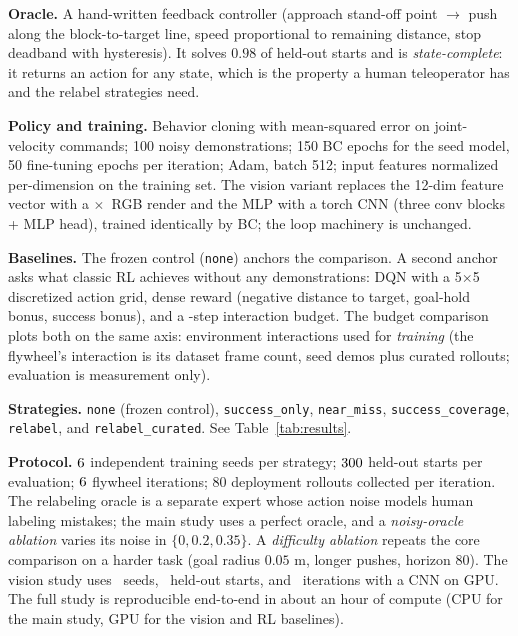 \documentclass[conference]{IEEEtran}
\begin{document}
\textbf{Oracle.} A hand-written feedback controller (approach stand-off
point $\rightarrow$ push along the block-to-target line, speed
proportional to remaining distance, stop deadband with hysteresis). It
solves $0.98$ of held-out starts and is \emph{state-complete}: it returns
an action for any state, which is the property a human teleoperator has and
the relabel strategies need.

\textbf{Policy and training.} Behavior cloning with mean-squared error on
joint-velocity commands; 100 noisy demonstrations; 150 BC epochs for the
seed model, 50 fine-tuning epochs per iteration; Adam, batch 512;
input features normalized per-dimension on the training set. The vision
variant replaces the 12-dim feature vector with a \visionImg$\times$\visionImg\
RGB render and the MLP with a torch CNN (three conv blocks + MLP head),
trained identically by BC; the loop machinery is unchanged.

\textbf{Baselines.} The frozen control (\texttt{none}) anchors the
comparison. A second anchor asks what classic RL achieves without any
demonstrations: DQN with a 5$\times$5 discretized action grid, dense reward
(negative distance to target, goal-hold bonus, success bonus), and a
\dqnSteps-step interaction budget. The budget comparison plots both on the
same axis: environment interactions used for \emph{training} (the flywheel's
interaction is its dataset frame count, seed demos plus curated rollouts;
evaluation is measurement only).

\textbf{Strategies.} \texttt{none} (frozen control), \texttt{success\_only},
\texttt{near\_miss}, \texttt{success\_coverage}, \texttt{relabel}, and
\texttt{relabel\_curated}. See Table~\ref{tab:results}.

\textbf{Protocol.} $6$ independent training seeds per strategy;
$300$ held-out starts per evaluation; $6$ flywheel iterations;
80 deployment rollouts collected per iteration. The relabeling oracle is a
separate expert whose action noise models human labeling mistakes; the
main study uses a perfect oracle, and a \emph{noisy-oracle ablation}
varies its noise in $\{0, 0.2, 0.35\}$. A \emph{difficulty ablation}
repeats the core comparison on a harder task (goal radius $0.05$ m,
longer pushes, horizon $80$). The vision study uses \visionSeeds\ seeds,
\visionEval\ held-out starts, and \visionIter\ iterations with a CNN on
GPU. The full study is reproducible end-to-end in about an hour of compute
(CPU for the main study, GPU for the vision and RL baselines).
\end{document}
